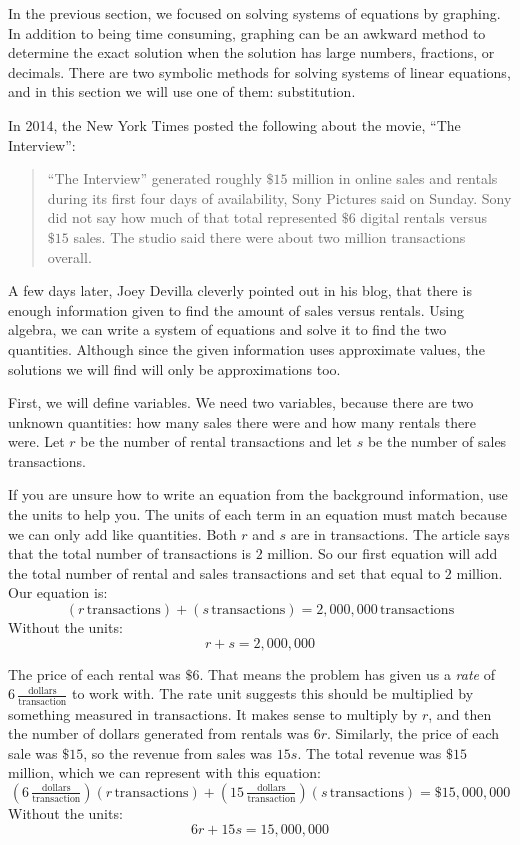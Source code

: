 \documentclass[nooutcomes]{ximera}
\begin{document}
      In the previous section,
      we focused on solving systems of equations by graphing.
      In addition to being time consuming,
      graphing can be an awkward method to determine the exact solution
      when the solution has large numbers, fractions, or decimals.
      There are two symbolic methods for solving systems of linear equations,
      and in this section we will use one of them:
      substitution.
\begin{example}
   In 2014, the New York Times
     posted the following about the movie, ``The Interview'':
\begin{quote}
 ``The Interview'' generated roughly $\$15$ million in online sales and rentals during its first four days of availability, Sony Pictures said on Sunday.
  Sony did not say how much of that total represented $\$6$ digital rentals versus $\$15$ sales.
          The studio said there were about two million transactions overall.
\end{quote}

     A few days later, Joey Devilla cleverly pointed out in his blog, that there is enough information given to find the amount of sales versus rentals.
        Using algebra,
        we can write a system of equations and solve it to find the two quantities.
        Although since the given information uses approximate values,
        the solutions we will find will only be approximations too.

    First, we will define variables.
        We need two variables, because there are two unknown quantities:
        how many sales there were and how many rentals there were.
        Let $r$ be the number of rental transactions and let $s$ be the number of sales transactions.

If you are unsure how to write an equation from the background information,
        use the units to help you.
        The units of each term in an equation must match because we can only add like quantities.
        Both $r$ and $s$ are in transactions.
        The article says that the total number of transactions is $2$ million.
        So our first equation will add the total number of rental and sales transactions and set that equal to $2$ million.
        Our equation is:
$$
  (r\,\text{transactions})+(s\,\text{transactions})=2{,}000{,}000\,\text{transactions}
$$
 Without the units:
$$
r+s=2{,}000{,}000
$$

  The price of each rental was $\$6$.
        That means the problem has given us a \textit{rate}
        of $6\,\frac{\text{dollars}}{\text{transaction}}$ to work with.
        The rate unit suggests this should be multiplied by something measured in transactions.
        It makes sense to multiply by $r$,
        and then the number of dollars generated from rentals was $6r$.
        Similarly, the price of each sale was $\$15$,
        so the revenue from sales was $15s$.
        The total revenue was $\$15$ million,
        which we can represent with this equation:
$$
          \left(6\,\tfrac{\text{dollars}}{\text{transaction}}\right)(r\,\text{transactions})+\left(15\,\tfrac{\text{dollars}}{\text{transaction}}\right)(s\,\text{transactions})=\$15{,}000{,}000
$$
        Without the units:
    $$
          6r+15s=15{,}000{,}000
     $$


\end{example}
\end{document}
